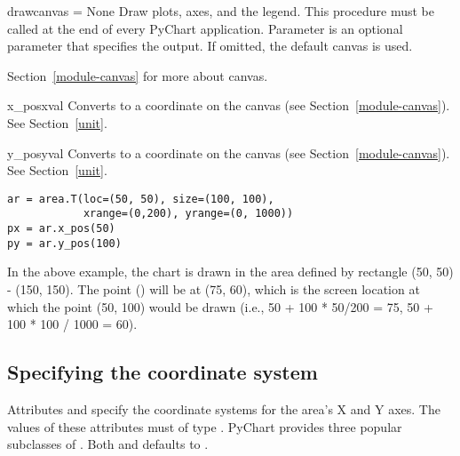 \documentclass{howto}
\newcommand{\pychart}{PyChart}
\newcommand{\xref}[1]{See Section~\ref{#1}}
\newcommand{\pxref}[1]{see Section~\ref{#1}}
\begin{document}
\begin{methoddesc}{draw}{canvas = None}
Draw plots, axes, and the legend. This procedure must be called at the
end of every \pychart{} application.
Parameter  is an optional parameter that specifies the output.
If omitted, the default canvas is used.
\begin{seealso}
Section~\ref{module-canvas} for more about canvas.
\end{seealso}
\end{methoddesc}

\begin{methoddesc}{x_pos}{xval}
Converts  to a coordinate on the canvas (\pxref{module-canvas}).
\xref{unit}.
\end{methoddesc}

\begin{methoddesc}{y_pos}{yval}
Converts  to a coordinate on the canvas (\pxref{module-canvas}).
\xref{unit}.
\end{methoddesc}

\begin{verbatim}
ar = area.T(loc=(50, 50), size=(100, 100),
            xrange=(0,200), yrange=(0, 1000))
px = ar.x_pos(50)
py = ar.y_pos(100)
\end{verbatim}

\noindent
In the above example, the chart is drawn in the area defined by
rectangle (50, 50) - (150, 150).  The point () will
be at (75, 60), which is the screen location at which the point
(50, 100) would be drawn (i.e., 50 + 100 * 50/200 = 75,
50 + 100 * 100 / 1000 = 60).


\subsection{Specifying the coordinate system}

Attributes  and  specify the coordinate
systems for the area's X and Y axes. The values of these attributes
must of type . \pychart{} provides three popular subclasses
of .  Both  and  defaults to
.
\end{document}
